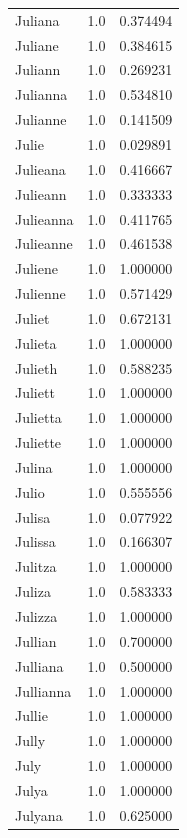 \documentclass[
  letterpaper,
  DIV=11,
  numbers=noendperiod]{scrreprt}
\begin{document}
\begin{tabular}{lrr}
Juliana         &   1.0 &   0.374494 \\
Juliane         &   1.0 &   0.384615 \\
Juliann         &   1.0 &   0.269231 \\
Julianna        &   1.0 &   0.534810 \\
Julianne        &   1.0 &   0.141509 \\
Julie           &   1.0 &   0.029891 \\
Julieana        &   1.0 &   0.416667 \\
Julieann        &   1.0 &   0.333333 \\
Julieanna       &   1.0 &   0.411765 \\
Julieanne       &   1.0 &   0.461538 \\
Juliene         &   1.0 &   1.000000 \\
Julienne        &   1.0 &   0.571429 \\
Juliet          &   1.0 &   0.672131 \\
Julieta         &   1.0 &   1.000000 \\
Julieth         &   1.0 &   0.588235 \\
Juliett         &   1.0 &   1.000000 \\
Julietta        &   1.0 &   1.000000 \\
Juliette        &   1.0 &   1.000000 \\
Julina          &   1.0 &   1.000000 \\
Julio           &   1.0 &   0.555556 \\
Julisa          &   1.0 &   0.077922 \\
Julissa         &   1.0 &   0.166307 \\
Julitza         &   1.0 &   1.000000 \\
Juliza          &   1.0 &   0.583333 \\
Julizza         &   1.0 &   1.000000 \\
Jullian         &   1.0 &   0.700000 \\
Julliana        &   1.0 &   0.500000 \\
Jullianna       &   1.0 &   1.000000 \\
Jullie          &   1.0 &   1.000000 \\
Jully           &   1.0 &   1.000000 \\
July            &   1.0 &   1.000000 \\
Julya           &   1.0 &   1.000000 \\
Julyana         &   1.0 &   0.625000 \\

\end{tabular}
\end{document}
